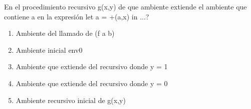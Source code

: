 {
 En el procedimiento recursivo g(x,y) de que ambiente extiende el ambiente que contiene a en la expresión let a = +(a,x) in ...?
\begin{enumerate}
	\item Ambiente del llamado de (f a b)
	\item Ambiente inicial env0
	\item Ambiente que extiende del recursivo donde y = 1
	\item Ambiente que extiende del recursivo donde y = 0 %
	\item Ambiente recursivo inicial de g(x,y)
\end{enumerate}
}
